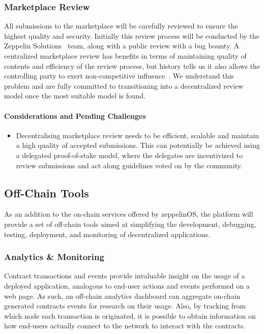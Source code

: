 \documentclass[]{article}
\makeatletter
\let\oldparagraph\paragraph
\renewcommand{\paragraph}[1]{\oldparagraph{#1}\mbox{}}
\DeclareRobustCommand{\_}{%
  \leavevmode\vbox{%
    \hrule\@width.5em
          \@height-.26ex
          \@depth\dimexpr.26ex+.28pt\relax}}
\makeatother
\begin{document}
\subsubsection{Marketplace Review}

All submissions to the marketplace will be carefully reviewed to ensure
the highest quality and security. Initially this review process will be
conducted by the Zeppelin Solutions~\cite{zeppelinsols} team, along with a public
review with a bug bounty. A centralized marketplace review has
benefits in terms of maintaining quality of contents and efficiency of
the review process, but history tells us it also allows the controlling
party to exert non-competitive influence~\cite{apple}. We understand this
problem and are fully committed to transitioning into a decentralized
review model once the most suitable model is found.

\paragraph{Considerations and Pending Challenges}

\begin{itemize}

  \item
    Decentralising marketplace review needs to be efficient, scalable and
    maintain a high quality of accepted submissions. This can potentially
    be achieved using a delegated proof-of-stake model, where the
    delegates are incentivized to review submissions and act along
    guidelines voted on by the community.

\end{itemize}

\subsection{Off-Chain Tools}

As an addition to the on-chain services offered by zeppelinOS, the
platform will provide a set of off-chain tools aimed at simplifying the
development, debugging, testing, deployment, and monitoring of
decentralized applications.

\subsubsection{Analytics \& Monitoring}

Contract transactions and events provide invaluable insight on the
usage of a deployed application, analogous to end-user actions and
events performed on a web page. As such, an off-chain analytics
dashboard can aggregate on-chain generated contracts events for research
on their usage. Also, by tracking from which node each transaction is
originated, it is possible to obtain information on how end-users actually
connect to the network to interact with the contracts.
\end{document}
